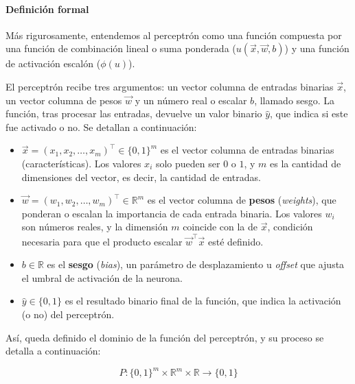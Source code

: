 \paragraph{Definición formal}
Más rigurosamente, entendemos al perceptrón como una función compuesta por una función de combinación lineal o suma ponderada ($u(\vec{x}, \vec{w}, b)$) y una función de activación escalón ($\phi(u)$).

El perceptrón recibe tres argumentos: un vector columna de entradas binarias $\vec{x}$, un vector columna de pesos $\vec{w}$ y un número real o escalar $b$, llamado sesgo. La función, tras procesar las entradas, devuelve un valor binario $\hat{y}$, que indica si este fue activado o no. Se detallan a continuación:

\begin{itemize}[topsep=2pt,itemsep=1pt]
  \item $\vec{x} = (x_1, x_2, \ldots, x_m)^\top \in \{0,1\}^m$ es el vector columna de entradas binarias (características). Los valores $x_i$ solo pueden ser $0$ o $1$, y $m$ es la cantidad de dimensiones del vector, es decir, la cantidad de entradas.
  \item $\vec{w} = (w_1, w_2, \ldots, w_m)^\top \in \mathbb{R}^m$ es el vector columna de \textbf{pesos} (\emph{weights}), que ponderan o escalan la importancia de cada entrada binaria. Los valores $w_i$ son números reales, y la dimensión $m$ coincide con la de $\vec{x}$, condición necesaria para que el producto escalar $\vec{w}^\top \vec{x}$ esté definido.
  \item $b \in \mathbb{R}$ es el \textbf{sesgo} (\emph{bias}), un parámetro de desplazamiento u \emph{offset} que ajusta el umbral de activación de la neurona.
  \item $\hat{y} \in \{0,1\}$ es el resultado binario final de la función, que indica la activación (o no) del perceptrón.
\end{itemize}

Así, queda definido el dominio de la función del perceptrón, y su proceso se detalla a continuación:

$$P: \{0,1\}^m \times \mathbb{R}^m \times \mathbb{R} \to \{0,1\}$$

